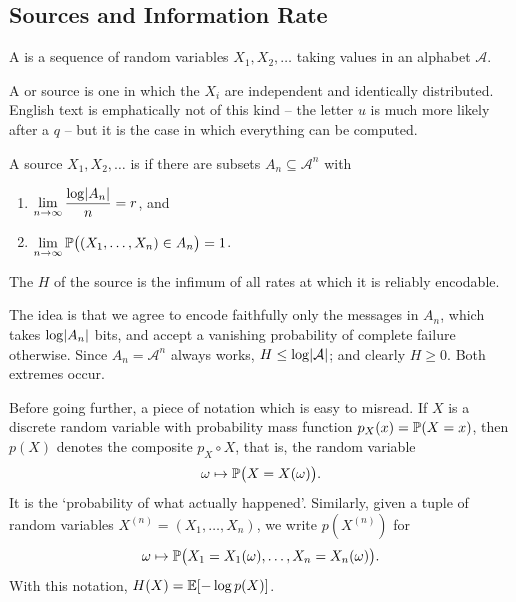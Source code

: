 \documentclass[a4paper]{scrartcl}
\newcommand{\Ac}{\mathcal{A}}
\begin{document}
\subsection{Sources and Information Rate}

\begin{definition}[Source]
	A  is a sequence of random variables $X_1, X_2, \dots$ taking values in an alphabet $\Ac$.
\end{definition}

\begin{example}
	A  or  source is one in which the $X_i$ are independent and identically distributed. English text is emphatically not of this kind -- the letter $u$ is much more likely after a $q$ -- but it is the case in which everything can be computed.
\end{example}

\begin{definition}
	A source $X_1, X_2, \dots$ is  if there are subsets $A_n \subseteq \Ac^n$ with
	\begin{enumerate}[label=(\roman*)]
		\item $\displaystyle \lim_{n\to\infty} \frac{\log \lvert A_n\rvert}{n} = r$, and
		\item $\displaystyle \lim_{n\to\infty} \mathbb{P}\bigl((X_1,\dots,X_n) \in A_n\bigr) = 1$.
	\end{enumerate}
	The  $H$ of the source is the infimum of all rates at which it is reliably encodable.
\end{definition}

The idea is that we agree to encode faithfully only the messages in $A_n$, which takes $\log\lvert A_n\rvert$ bits, and accept a vanishing probability of complete failure otherwise. Since $A_n = \Ac^n$ always works, $H \le \log\abs{\Ac}$; and clearly $H \ge 0$. Both extremes occur.

Before going further, a piece of notation which is easy to misread. If $X$ is a discrete random variable with probability mass function $p_X(x) = \mathbb{P}(X = x)$, then $p(X)$ denotes the composite $p_X \circ X$, that is, the random variable
$$\omega \mapsto \mathbb{P}\bigl(X = X(\omega)\bigr).$$
It is the `probability of what actually happened'. Similarly, given a tuple of random variables $X^{(n)} = (X_1, \dots, X_n)$, we write $p(X^{(n)})$ for
$$\omega \mapsto \mathbb{P}\bigl(X_1 = X_1(\omega), \dots, X_n = X_n(\omega)\bigr).$$
With this notation, $H(X) = \mathbb{E}[-\log p(X)]$.
\end{document}
